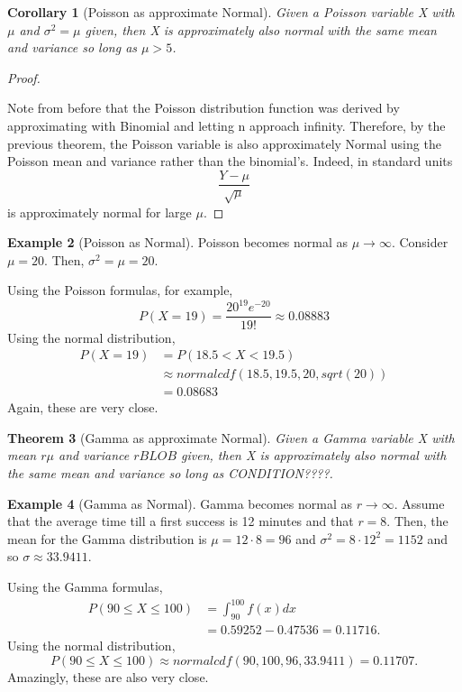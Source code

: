 \documentclass[10pt,]{book}
\theoremstyle{plain}
\newtheorem{theorem}{Theorem}[section]
\newtheorem{corollary}[theorem]{Corollary}
\theoremstyle{definition}
\theoremstyle{definition}
\newtheorem{example}[theorem]{Example}
\theoremstyle{definition}
\numberwithin{equation}{section}
\newcommand{\lt}{ < }
\newcommand{\gt}{ > }
\begin{document}
\begin{corollary}[{Poisson as approximate Normal}]\label{corollary-7}
Given a Poisson variable X with \(\mu\) and \(\sigma^2 = \mu\) given, then X is approximately also normal with the same mean and variance so long as \(\mu \gt 5\).
\end{corollary}
\begin{proof}\hypertarget{proof-61}{}

Note from before that the Poisson distribution function was derived by approximating with Binomial and letting n approach infinity. Therefore, by the previous theorem, the Poisson variable is also approximately Normal using the Poisson mean and variance rather than the binomial's. Indeed, in standard units
\begin{equation*}\frac{Y - \mu}{\sqrt{\mu}}\end{equation*}
is approximately normal for large \(\mu\).
%
\end{proof}
\begin{example}[Poisson as Normal]\label{example-24}
Poisson becomes normal as \( \mu \rightarrow \infty\).  Consider \(\mu = 20\).  Then, \(\sigma^2 = \mu = 20\).   
%
\par
Using the Poisson formulas, for example,
\begin{equation*}P( X = 19 ) = \frac{20^{19} e^{-20}}{19!} \approx 0.08883\end{equation*}
Using the normal distribution,
\begin{align*}
P( X = 19 ) & = P( 18.5 \lt X \lt 19.5) \\
 & \approx normalcdf(18.5,19.5,20,sqrt(20)) \\
 & = 0.08683
\end{align*}
Again, these are very close.
%
\end{example}
\begin{theorem}[{Gamma as approximate Normal}]\label{theorem-66}
Given a Gamma variable X with mean \(r \mu\) and variance \( r BLOB\) given, then X is approximately also normal with the same mean and variance so long as CONDITION????.
\end{theorem}
\begin{example}[Gamma as Normal]\label{example-25}
Gamma becomes normal as \( r \rightarrow \infty\).  Assume that the average time till a first success is 12 minutes and that \(r = 8\).  Then, the mean for the Gamma distribution is \(\mu = 12 \cdot 8 = 96\) and \(\sigma^2 = 8 \cdot 12^2 = 1152\) and so \(\sigma \approx 33.9411\).   
%
\par
Using the Gamma formulas, 
\begin{align*}
P( 90 \le X \le 100 ) & = \int_{90}^{100} f(x) dx \\
 & = 0.59252 - 0.47536 = 0.11716.
\end{align*}
Using the normal distribution,
\begin{equation*}P( 90 \le X \le 100) \approx normalcdf(90,100,96,33.9411) = 0.11707.\end{equation*}
Amazingly, these are also very close.
%
\end{example}
\end{document}

